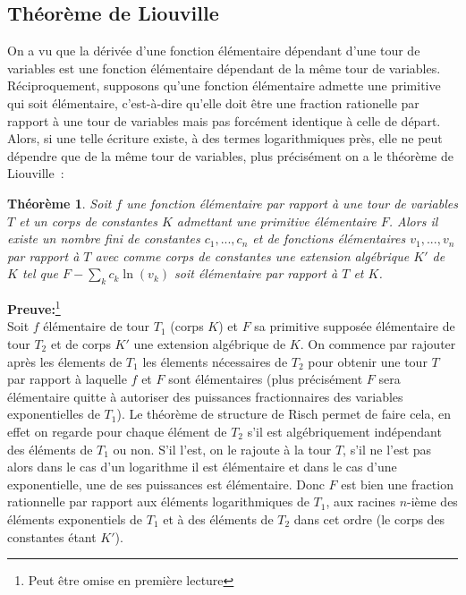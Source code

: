 \documentclass[a4paper,11pt]{book}
\newtheorem{thm}{Théorème}
\begin{document}
\begin{giacjshere}
\subsection{Théorème de Liouville}
On a vu que la d\'eriv\'ee d'une fonction élémentaire dépendant 
d'une tour de variables est une fonction élémentaire dépendant 
de la même tour de variables.
Réciproquement, supposons qu'une fonction élémentaire admette
une primitive qui soit élémentaire, c'est-à-dire qu'elle doit
être une fraction rationelle par rapport à une tour de variables
mais pas forcément identique à celle de départ. Alors, si une telle
écriture existe, à des termes logarithmiques près, elle
ne peut dépendre que de la même tour de variables, plus précisément
on a le théorème de Liouville~:
\begin{thm}
Soit $f$ une fonction élémentaire par rapport à une tour de variables $T$
et un corps de constantes $K$ admettant une primitive élémentaire $F$. Alors 
il existe un nombre fini de constantes $c_1,...,c_n$ et de fonctions
élémentaires $v_1,...,v_n$ par rapport à $T$ avec comme corps de constantes
une extension algébrique $K'$ de $K$ tel que $F - \sum_k c_k \ln(v_k) $
soit élémentaire par rapport à $T$ et $K$.
\end{thm}

{\bf Preuve:}\footnote{Peut être omise en première lecture}\\
Soit $f$ élémentaire de tour $T_1$ (corps $K$) et 
$F$ sa primitive supposée élémentaire de tour $T_2$ et de corps $K'$
une extension algébrique de $K$. 
On commence par rajouter après les élements de $T_1$ les 
élements nécessaires de $T_2$ pour obtenir une tour $T$ par rapport
à laquelle $f$ et $F$ sont élémentaires (plus précisément $F$ sera
élémentaire quitte à autoriser des puissances fractionnaires
des variables exponentielles de $T_1$). Le théorème de structure
de Risch permet de faire cela, en effet on regarde pour chaque
élément de $T_2$ s'il est algébriquement indépendant des éléments
de $T_1$ ou non. S'il l'est, on le rajoute à la tour $T$, s'il
ne l'est pas alors dans le cas d'un logarithme il est élémentaire
et dans le cas d'une exponentielle, une de ses puissances est
élémentaire. Donc $F$ est bien une fraction rationnelle par rapport
aux éléments logarithmiques de $T_1$, aux racines $n$-ième
des éléments exponentiels de $T_1$ et à des éléments de $T_2$
dans cet ordre (le corps des constantes étant $K'$).


\end{giacjshere}
\end{document}
